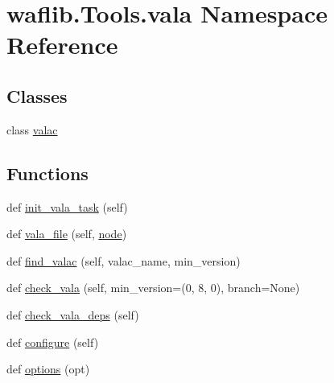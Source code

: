 \hypertarget{namespacewaflib_1_1_tools_1_1vala}{}\section{waflib.\+Tools.\+vala Namespace Reference}
\label{namespacewaflib_1_1_tools_1_1vala}
\subsection*{Classes}
\begin{DoxyCompactItemize}
\item 
class \hyperlink{classwaflib_1_1_tools_1_1vala_1_1valac}{valac}
\end{DoxyCompactItemize}
\subsection*{Functions}
\begin{DoxyCompactItemize}
\item 
def \hyperlink{namespacewaflib_1_1_tools_1_1vala_afedcf657dff8a988abdf3f52dc1b1584}{init\+\_\+vala\+\_\+task} (self)
\item 
def \hyperlink{namespacewaflib_1_1_tools_1_1vala_a6baf611b698503ed4c43e8ff2e870acd}{vala\+\_\+file} (self, \hyperlink{structnode}{node})
\item 
def \hyperlink{namespacewaflib_1_1_tools_1_1vala_afcb54ec67c0f38a26b8cf34ae9c89b7b}{find\+\_\+valac} (self, valac\+\_\+name, min\+\_\+version)
\item 
def \hyperlink{namespacewaflib_1_1_tools_1_1vala_a3093897181665808445ee213a19a6d64}{check\+\_\+vala} (self, min\+\_\+version=(0, 8, 0), branch=None)
\item 
def \hyperlink{namespacewaflib_1_1_tools_1_1vala_a0e50168b039627d93b07929537af57af}{check\+\_\+vala\+\_\+deps} (self)
\item 
def \hyperlink{namespacewaflib_1_1_tools_1_1vala_aa13ac0bb84782b53e5cf4761adb55657}{configure} (self)
\item 
def \hyperlink{namespacewaflib_1_1_tools_1_1vala_a17771e1da92206049384a4fea5523b78}{options} (opt)
\end{DoxyCompactItemize}
